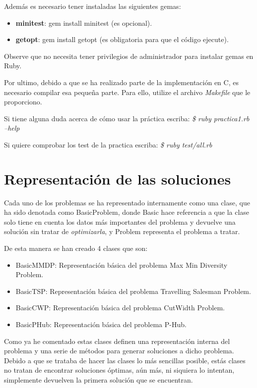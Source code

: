 \documentclass[12pt,a4paper,draft,openany]{article}
\begin{document}
Además es necesario tener instaladas las siguientes gemas:
\begin{itemize}
\item \textbf{minitest}: gem install minitest (es opcional).
\item \textbf{getopt}: gem install getopt (es obligatoria para que el código ejecute).
\end{itemize}

Observe que no necesita tener privilegios de administrador para instalar gemas en Ruby.

Por ultimo, debido a que se ha realizado parte de la implementación en C, es necesario compilar esa pequeña parte. Para ello, utilize el archivo \emph{Makefile} que le proporciono.

Si tiene alguna duda acerca de cómo usar la práctica escriba: \newline
\emph{\$ ruby practica1.rb --help}

Si quiere comprobar los test de la practica escriba: \newline
\emph{\$ ruby test/all.rb}

\section{Representación de las soluciones}
Cada uno de los problemas se ha representado internamente como una clase, que ha sido denotada como BasicProblem, donde Basic hace referencia a que la clase solo tiene en cuenta los datos más importantes del problema y devuelve una solución sin tratar de \emph{optimizarla}, y Problem representa el problema a tratar.

De esta manera se han creado 4 clases que son:
\begin{itemize}
\item BasicMMDP: Representación básica del problema Max Min Diversity Problem.
\item BasicTSP: Representación básica del problema Travelling Salesman Problem.
\item BasicCWP: Representación básica del problema CutWidth Problem.
\item BasicPHub: Representación básica del problema P-Hub.
\end{itemize}

Como ya he comentado estas clases definen una representación interna del problema y una serie de métodos para generar soluciones a dicho problema. Debido a que se trataba de hacer las
clases lo más sencillas posible, estás clases no tratan de encontrar soluciones óptimas, aún más, ni siquiera lo intentan, simplemente devuelven la primera solución que se encuentran.
\end{document}
